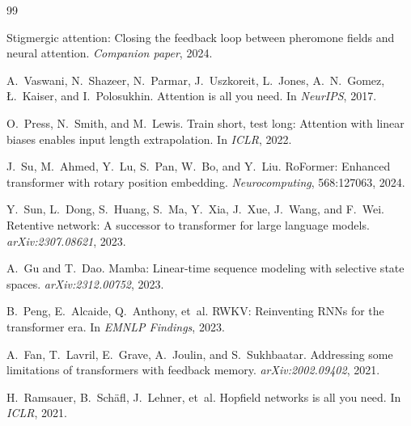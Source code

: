\documentclass[11pt,a4paper]{article}
\begin{document}
\begin{thebibliography}{99}

Stigmergic attention: Closing the feedback loop between pheromone
fields and neural attention.
\emph{Companion paper}, 2024.


A.~Vaswani, N.~Shazeer, N.~Parmar, J.~Uszkoreit, L.~Jones,
A.~N.~Gomez, \L.~Kaiser, and I.~Polosukhin.
Attention is all you need.
In \emph{NeurIPS}, 2017.

O.~Press, N.~Smith, and M.~Lewis.
Train short, test long: Attention with linear biases enables input
length extrapolation.
In \emph{ICLR}, 2022.

J.~Su, M.~Ahmed, Y.~Lu, S.~Pan, W.~Bo, and Y.~Liu.
RoFormer: Enhanced transformer with rotary position embedding.
\emph{Neurocomputing}, 568:127063, 2024.

Y.~Sun, L.~Dong, S.~Huang, S.~Ma, Y.~Xia, J.~Xue, J.~Wang, and F.~Wei.
Retentive network: A successor to transformer for large language models.
\emph{arXiv:2307.08621}, 2023.

A.~Gu and T.~Dao.
Mamba: Linear-time sequence modeling with selective state spaces.
\emph{arXiv:2312.00752}, 2023.

B.~Peng, E.~Alcaide, Q.~Anthony, et~al.
RWKV: Reinventing RNNs for the transformer era.
In \emph{EMNLP Findings}, 2023.

A.~Fan, T.~Lavril, E.~Grave, A.~Joulin, and S.~Sukhbaatar.
Addressing some limitations of transformers with feedback memory.
\emph{arXiv:2002.09402}, 2021.

H.~Ramsauer, B.~Sch\"{a}fl, J.~Lehner, et~al.
Hopfield networks is all you need.
In \emph{ICLR}, 2021.

\end{thebibliography}
\end{document}
